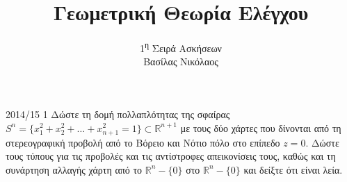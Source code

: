 \documentclass[a4paper,11pt]{article}
\begin{document}
\title{Γεωμετρική Θεωρία Ελέγχου}
\author{1\textsuperscript{η} Σειρά Ασκήσεων\\Βασίλας Νικόλαος}
\maketitle

\begin{exercise}{2014/15 1}
    Δώστε τη δομή πολλαπλότητας της σφαίρας
    \(S^n = \{ x_1^2 + x_2^2 + \dots + x^2_{n+1} = 1 \} \subset \mathbb{R}^{n+1}\)
    με τους δύο χάρτες που δίνονται από τη στερεογραφική προβολή από το Βόρειο
    και Νότιο πόλο στο επίπεδο \( z = 0 \). Δώστε τους τύπους για τις προβολές
    και τις αντίστροφες απεικονίσεις τους, καθώς και τη συνάρτηση αλλαγής χάρτη
    από το \( \mathbb{R}^n - \{0\} \) στο \( \mathbb{R}^n - \{0\} \) και δείξτε
    ότι είναι λεία.
\end{exercise}
\end{document}
